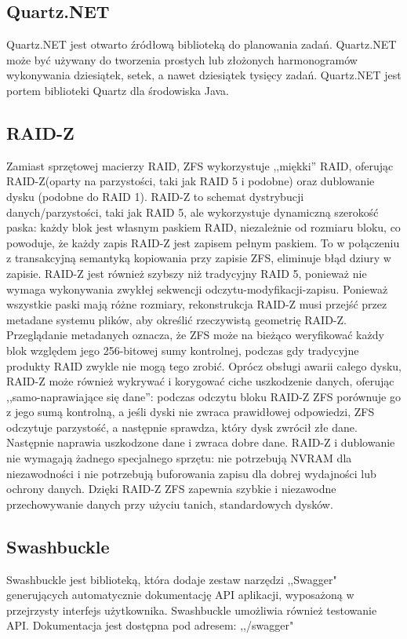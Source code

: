 \documentclass[12pt,a4paper]{article}
\begin{document}
		\subsection{Quartz.NET}
			\indent Quartz.NET jest otwarto źródłową biblioteką do planowania zadań.
			Quartz.NET może być używany do tworzenia prostych lub złożonych harmonogramów wykonywania
			dziesiątek, setek, a nawet dziesiątek tysięcy zadań.
			Quartz.NET jest portem biblioteki Quartz dla środowiska Java. 	 
		
		\subsection{RAID-Z}
			\indent Zamiast sprzętowej macierzy RAID, ZFS wykorzystuje ,,miękki'' RAID, oferując RAID-Z(oparty na parzystości, taki jak RAID 5 i podobne) oraz dublowanie dysku
			(podobne do RAID 1). RAID-Z to schemat dystrybucji danych/parzystości, taki jak RAID 5, ale wykorzystuje dynamiczną szerokość paska: każdy blok jest własnym paskiem
			RAID, niezależnie od rozmiaru
			bloku, co powoduje, że każdy zapis RAID-Z jest zapisem pełnym paskiem. To w połączeniu z transakcyjną semantyką kopiowania przy zapisie ZFS, eliminuje błąd dziury w zapisie.
			RAID-Z jest również szybszy niż tradycyjny RAID 5, ponieważ nie wymaga wykonywania zwykłej sekwencji odczytu-modyfikacji-zapisu. Ponieważ wszystkie paski mają różne rozmiary,
			rekonstrukcja RAID-Z musi przejść przez metadane systemu plików, aby określić rzeczywistą geometrię RAID-Z. Przeglądanie metadanych oznacza, że ZFS może na bieżąco
			weryfikować każdy blok względem jego 256-bitowej sumy kontrolnej, podczas gdy tradycyjne produkty RAID zwykle nie mogą tego zrobić. Oprócz obsługi awarii całego dysku,
			RAID-Z może również wykrywać i korygować ciche uszkodzenie danych, oferując ,,samo-naprawiające się dane'': podczas odczytu bloku RAID-Z ZFS porównuje go z jego sumą kontrolną,
			a jeśli dyski nie zwraca prawidłowej odpowiedzi, ZFS odczytuje parzystość, a następnie sprawdza, który dysk zwrócił złe dane. Następnie naprawia uszkodzone dane i zwraca
			dobre dane. RAID-Z i dublowanie nie wymagają żadnego specjalnego sprzętu: nie potrzebują NVRAM dla niezawodności i nie potrzebują buforowania zapisu dla dobrej wydajności
			lub ochrony danych. Dzięki RAID-Z ZFS zapewnia szybkie i niezawodne przechowywanie danych przy użyciu tanich, standardowych dysków.
						 
		\subsection{Swashbuckle}
			\indent Swashbuckle jest biblioteką, która dodaje zestaw narzędzi ,,Swagger" generujących automatycznie dokumentację API aplikacji,
				wyposażoną w przejrzysty interfejs użytkownika. Swashbuckle umożliwia również testowanie API. Dokumentacja jest dostępna pod adresem: ,,/swagger"
		
\end{document}
